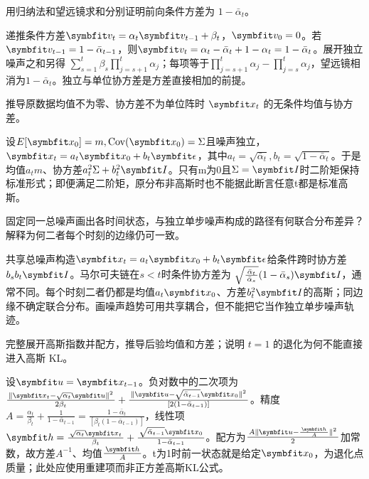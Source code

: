 
\begin{exercises}
\begin{exercise} 用归纳法和望远镜求和分别证明前向条件方差为 $1-\bar\alpha_t$。

\begin{solution}
递推条件方差$\vect{v}_t=\alpha_t\vect{v}_{t-1}+\beta_t$，$\vect{v}_0=0$。若$\vect{v}_{t-1}=1-\bar\alpha_{t-1}$，则$\vect{v}_t=\alpha_t-\bar\alpha_t+1-\alpha_t=1-\bar\alpha_t$。展开独立噪声之和另得 $\sum_{s=1}^t\beta_s\prod_{j=s+1}^t\alpha_j$；每项等于$\prod_{j=s+1}^t\alpha_j-\prod_{j=s}^t\alpha_j$，望远镜相消为$1-\bar\alpha_t$。独立与单位协方差是方差直接相加的前提。
\end{solution}
\end{exercise}

\begin{exercise} 推导原数据均值不为零、协方差不为单位阵时 $\vect{x}_t$ 的无条件均值与协方差。

\begin{solution}
设$E[\vect{x}_0]=m,\operatorname{Cov}(\vect{x}_0)=\Sigma$且噪声独立，$\vect{x}_t=a_t\vect{x}_0+b_t\vect{\epsilon}$，其中$a_t=\sqrt{\bar\alpha_t},b_t=\sqrt{1-\bar\alpha_t}$。于是均值$a_tm$、协方差$a_t^2\Sigma+b_t^2\mat{I}$。只有m为0且$\Sigma=\mat{I}$时二阶矩保持标准形式；即便满足二阶矩，原分布非高斯时也不能据此断言任意t都是标准高斯。
\end{solution}
\end{exercise}

\begin{exercise} 固定同一总噪声画出各时间状态，与独立单步噪声构成的路径有何联合分布差异？解释为何二者每个时刻的边缘仍可一致。

\begin{solution}
共享总噪声构造$\vect{x}_t=a_t\vect{x}_0+b_t\vect{\epsilon}$给条件跨时协方差$b_sb_t\mat{I}$。马尔可夫链在$s<t$时条件协方差为 $\sqrt{\frac{\bar\alpha_t}{\bar\alpha_s}}(1-\bar\alpha_s)\mat{I}$，通常不同。每个时刻二者仍都是均值$a_t\vect{x}_0$、方差$b_t^2\mat{I}$的高斯；同边缘不确定联合分布。画噪声趋势可用共享耦合，但不能把它当作独立单步噪声轨迹。
\end{solution}
\end{exercise}

\begin{exercise} 完整展开高斯指数并配方，推导后验均值和方差；说明 $t=1$ 的退化为何不能直接进入高斯 KL。

\begin{solution}
设$\vect{u}=\vect{x}_{t-1}$。负对数中的二次项为 $\frac{\|\vect{x}_t-\sqrt{\alpha_t}\vect{u}\|^2}{2\beta_t}+\frac{\|\vect{u}-\sqrt{\bar\alpha_{t-1}}\vect{x}_0\|^2}{[2(1-\bar\alpha_{t-1})]}$。精度 $A=\frac{\alpha_t}{\beta_t}+\frac{1}{1-\bar\alpha_{t-1}}=\frac{1-\bar\alpha_t}{[\beta_t(1-\bar\alpha_{t-1})]}$，线性项 $\vect{h}=\frac{\sqrt{\alpha_t}\vect{x}_t}{\beta_t}+\frac{\sqrt{\bar\alpha_{t-1}}\vect{x}_0}{1-\bar\alpha_{t-1}}$。配方为$\frac{A\|\vect{u}-\frac{\vect{h}}{A}\|^2}{2}$加常数，故方差$A^{-1}$、均值$\frac{\vect{h}}{A}$。t为1时前一状态就是给定$\vect{x}_0$，为退化点质量；此处应使用重建项而非正方差高斯KL公式。
\end{solution}
\end{exercise}


\end{exercises}
